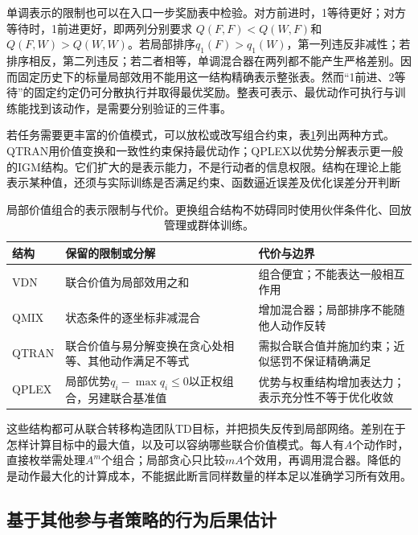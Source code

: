 单调表示的限制也可以在入口一步奖励表中检验。对方前进时，1等待更好；对方等待时，1前进更好，即两列分别要求
$Q(F,F)<Q(W,F)$和$Q(F,W)>Q(W,W)$。若局部排序$q_1(F)>q_1(W)$，第一列违反非减性；若排序相反，第二列违反；若二者相等，单调混合器在两列都不能产生严格差别。因而固定历史下的标量局部效用不能用这一结构精确表示整张表。然而“1前进、2等待”的固定约定仍可分散执行并取得最优奖励。整表可表示、最优动作可执行与训练能找到该动作，是需要分别验证的三件事。

若任务需要更丰富的价值模式，可以放松或改写组合约束，表\ref{tab:rl-multi-agent-factorization}列出两种方式。QTRAN用价值变换和一致性约束保持最优动作；QPLEX以优势分解表示更一般的IGM结构。它们扩大的是表示能力，不是行动者的信息权限。结构在理论上能表示某种值，还须与实际训练是否满足约束、函数逼近误差及优化误差分开判断

\begin{table}[htbp]
 \centering
 \begin{tabularx}{\linewidth}{@{}l >{\raggedright\arraybackslash}X >{\raggedright\arraybackslash}X@{}}
 \toprule
 结构 & 保留的限制或分解 & 代价与边界\\
 \midrule
 VDN & 联合价值为局部效用之和 & 组合便宜；不能表达一般相互作用\\
 QMIX & 状态条件的逐坐标非减混合 & 增加混合器；局部排序不能随他人动作反转\\
 QTRAN & 联合价值与易分解变换在贪心处相等、其他动作满足不等式 & 需拟合联合值并施加约束；近似惩罚不保证精确满足\\
 QPLEX & 局部优势$q_i-\max q_i\leq0$以正权组合，另建联合基准值 & 优势与权重结构增加表达力；表示充分性不等于优化收敛\\
 \bottomrule
 \end{tabularx}
 \caption{局部价值组合的表示限制与代价。更换组合结构不妨碍同时使用伙伴条件化、回放管理或群体训练。}
 \label{tab:rl-multi-agent-factorization}
\end{table}

这些结构都可从联合转移构造团队TD目标，并把损失反传到局部网络。差别在于怎样计算目标中的最大值，以及可以容纳哪些联合价值模式。每人有$A$个动作时，直接枚举需处理$A^m$个组合；局部贪心只比较$mA$个效用，再调用混合器。降低的是动作最大化的计算成本，不能据此断言同样数量的样本足以准确学习所有效用。

\subsection{基于其他参与者策略的行为后果估计}
\label{sec:rl-multi-agent-opponent-model}

